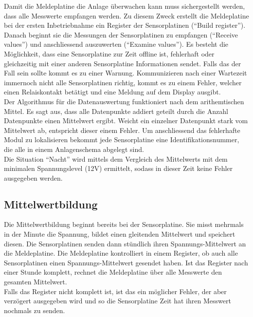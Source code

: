 \newpage

Damit die Meldeplatine die Anlage überwachen kann muss sichergestellt werden, dass alle Messwerte empfangen werden. Zu diesem Zweck erstellt die Meldeplatine bei der ersten Inbetriebnahme ein Register der Sensorplatinen (``Build register''). Danach beginnt sie die Messungen der Sensorplatinen zu empfangen (``Receive values'') und anschliessend auszuwerten (``Examine values''). Es besteht die Möglichkeit, dass eine Sensorplatine zur Zeit offline ist, fehlerhaft oder gleichzeitig mit einer anderen Sensorplatine Informationen sendet. Falls das der Fall sein sollte kommt es zu einer Warnung. Kommunizieren nach einer Wartezeit immernoch nicht alle Sensorplatinen richtig, kommt es zu einem Fehler, welcher einen Relaiskontakt betätigt und eine Meldung auf dem Display ausgibt.\\
Der Algorithmus für die Datenauswertung funktioniert nach dem arithemtischen Mittel. Es sagt aus, dass alle Datenpunkte addiert geteilt durch die Anzahl Datenpunkte einen Mittelwert ergibt. Weicht ein einzelner Datenpunkt stark vom Mittelwert ab, entspricht dieser einem Fehler. Um anschliessend das fehlerhafte Modul zu lokalisieren bekommt jede Sensorplatine eine Identifikationsnummer, die alle in einem Anlagenschema abgelegt sind.\\

Die Situation ``Nacht'' wird mittels dem Vergleich des Mittelwerts mit dem minimalen Spannungslevel (12V) ermittelt, sodass in dieser Zeit keine Fehler ausgegeben werden.


\subsection{Mittelwertbildung}
Die Mittelwertbildung beginnt bereits bei der Sensorplatine. Sie misst mehrmals in der Minute die Spannung, bildet einen gleitenden Mittelwert und speichert diesen. Die Sensorplatinen senden dann stündlich ihren Spannungs-Mittelwert an die Meldeplatine. Die Meldeplatine kontrolliert in einem Register, ob auch alle Sensorplatinen einen Spannungs-Mittelwert gesendet haben. Ist das Register nach einer Stunde komplett, rechnet die Meldeplatine über alle Messwerte den gesamten Mittelwert.\\
Falls das Register nicht komplett ist, ist das ein möglicher Fehler, der aber verzögert ausgegeben wird und so die Sensorplatine Zeit hat ihren Messwert nochmals zu senden.
%